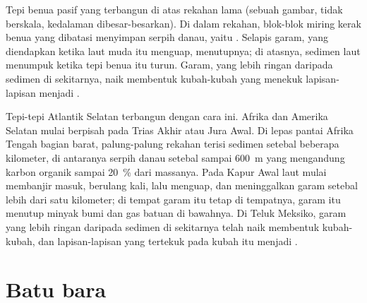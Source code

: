 \begin{omfigure}

{\small Tepi benua pasif yang terbangun di atas rekahan lama (sebuah gambar,
tidak berskala, kedalaman dibesar-besarkan). Di dalam rekahan, blok-blok miring
kerak benua yang dibatasi  menyimpan serpih danau, yaitu . Selapis garam, yang diendapkan ketika laut muda itu menguap,
menutupnya; di atasnya, sedimen laut menumpuk ketika tepi benua itu turun.
Garam, yang lebih ringan daripada sedimen di sekitarnya, naik membentuk
kubah-kubah yang menekuk lapisan-lapisan menjadi .}
\end{omfigure}

Tepi-tepi Atlantik Selatan terbangun dengan cara ini. Afrika dan Amerika
Selatan mulai berpisah pada Trias Akhir atau Jura Awal. Di lepas pantai Afrika
Tengah bagian barat, palung-palung rekahan terisi sedimen setebal beberapa
kilometer, di antaranya serpih danau setebal sampai \qty{600}{m} yang
mengandung karbon organik sampai \qty{20}{\percent} dari massanya. Pada Kapur
Awal laut mulai membanjir masuk, berulang kali, lalu menguap, dan meninggalkan
garam setebal lebih dari satu kilometer; di tempat garam itu tetap di
tempatnya, garam itu menutup minyak bumi dan gas batuan di bawahnya. Di Teluk
Meksiko, garam yang lebih ringan daripada sedimen di sekitarnya telah naik
membentuk kubah-kubah, dan lapisan-lapisan yang tertekuk pada kubah itu menjadi
.

\section{Batu bara}

